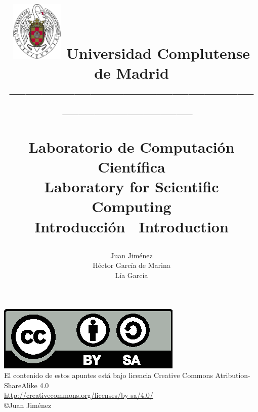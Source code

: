 \documentclass[a4paper,10pt]{book}
\begin{document}
\title{
\begin{flushleft}
\includegraphics[width=2.5cm]{ucm2.pdf}
Universidad Complutense de Madrid\\
---------------------------------------------------------------------\
\end{flushleft}
Laboratorio de Computaci\'on Cient\'ifica\\Laboratory for Scientific Computing\\ Introducción \textreferencemark\ Introduction }
\author{ Juan Jim\'enez\\ H\'ector Garc\'ia de Marina\\ L\'ia Garc\'ia }
\maketitle
\vspace*{\fill}

\includegraphics[scale=1]{by-sa.eps}\\
El contenido de estos apuntes est\'a bajo licencia Creative Commons Atribution-ShareAlike 4.0\\
\href{http://creativecommons.org/licenses/by-sa/4.0/}{http://creativecommons.org/licenses/by-sa/4.0/}\\
\copyright Juan Jim\'enez

\bigskip
\tableofcontents
\listoffigures
\listoftables



%
%
%
%
%
%
%
%
%
%
\printindex
\printindex[eng]
\end{document}
